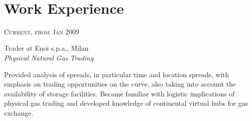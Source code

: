 \documentclass[10pt]{article} %
\begin{document}
\color{text1} %


\par{\\ %
	

\begin{minipage}[t]{0.5\textwidth} %
\vspace{0pt} %
	

\section{Work Experience} 


{\raggedleft\textsc{Current, from Jan 2009}\par}

{\raggedright\large Trader at Enoi s.p.a., Milan\\
\textit{Physical Natural Gas Trading}\\[5pt]}

\normalsize{Provided analysis of spreads, in particular time and location spreads, with emphasis on trading opportunities on the curve, also taking into account the availability of storage facilities. Became familiar with logistic implications of physical gas trading and developed knowledge of continental virtual hubs for gas exchange.}\\



\end{minipage}}
\end{document}
